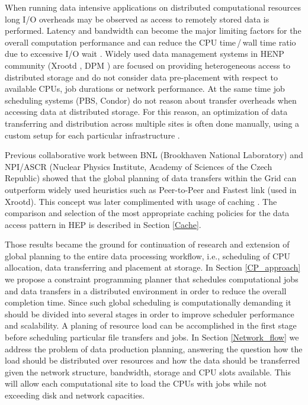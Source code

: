 \documentclass[english]{ddny}
\begin{document}
When running data intensive applications on distributed computational resources long I/O overheads may be observed as access to remotely stored data is performed. Latency and bandwidth can become the major limiting factors for the overall computation performance and can reduce the CPU time\,/\,wall time ratio due to excessive I/O wait \cite{Betev,HorkyACAT}.  Widely used data management systems in HENP community (Xrootd \cite{Xrootd}, DPM \cite{DPM}) are focused on providing heterogeneous access to distributed storage and do not consider data pre-placement with respect to available CPUs, job durations or network performance. At the same time job scheduling systems (PBS, Condor) do not reason about transfer overheads when accessing data at distributed storage. For this reason, an optimization of data transferring and distribution across multiple sites is often done manually, using a custom setup for each particular infrastructure \cite{Balewski}.

Previous collaborative work between BNL (Brookhaven National Laboratory) and NPI/ASCR (Nuclear Physics Institute, Academy of Sciences of the Czech Republic) showed that the global planning of data transfers within the Grid can outperform widely used heuristics such as Peer-to-Peer and Fastest link (used in Xrootd)\cite{Zerola}. This concept was later complimented with usage of caching \cite{Makatun_cache}. The comparison and selection of the most appropriate caching policies for the data access pattern in HEP is described in Section \ref{Cache}. 
 
Those results became the ground for continuation of research and extension of global planning to the entire data processing workflow, i.e., scheduling of CPU allocation, data transferring and  placement at storage. In Section \ref{CP_approach} we propose a constraint programming planner that schedules computational jobs and data transfers in a distributed environment in order to reduce the overall completion time. Since such global scheduling is computationally demanding it should be divided into several stages in order to improve scheduler performance and scalability. A planing of resource load can be accomplished in the first stage before scheduling particular file transfers and jobs. In Section \ref{Network_flow} we address the problem of data production planning, answering the question how the load should be distributed over resources and how the data should be transferred given the network structure, bandwidth, storage and CPU slots available. This will allow each computational site to load the CPUs with jobs while not exceeding disk and network capacities.
\end{document}
